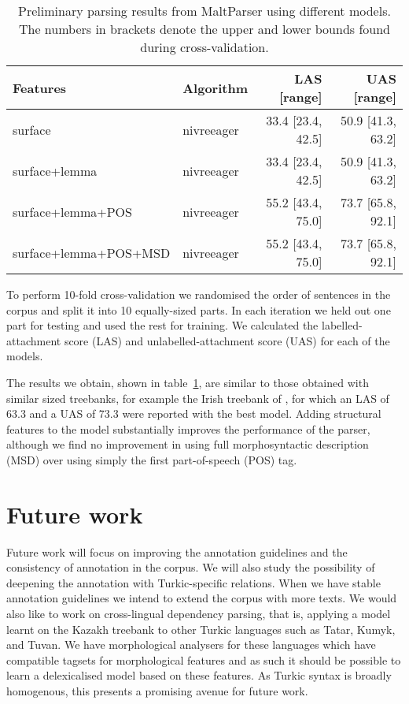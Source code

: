 \documentclass[a4paper,11pt, onecolumn,twoside]{article}
\begin{document}
\begin{table}[htbp]
	\caption{Preliminary parsing results from MaltParser using different models. The numbers in brackets denote the upper and lower bounds found during cross-validation.}
	\centering
	\begin{tabular}{llrr}
		\toprule
			\textbf{Features}       & \textbf{Algorithm} &\textbf{LAS} [range] & \textbf{UAS} [range] \\
		\midrule
			surface                & nivreeager  & 33.4 [23.4, 42.5] & 50.9 [41.3, 63.2] \\
			surface+lemma          & nivreeager  & 33.4 [23.4, 42.5] & 50.9 [41.3, 63.2] \\
			surface+lemma+POS      & nivreeager  & 55.2 [43.4, 75.0] & 73.7 [65.8, 92.1] \\
			surface+lemma+POS+MSD  & nivreeager  & 55.2 [43.4, 75.0] & 73.7 [65.8, 92.1] \\
		\bottomrule
	\end{tabular}
	\label{table:eval}
\end{table}

To perform 10-fold cross-validation we randomised the order of sentences in the corpus
and split it into 10 equally-sized parts. In each iteration we held out one part for testing and used
the rest for training. We calculated the labelled-attachment score (LAS) and 
unlabelled-attachment score (UAS) for each of the models.

The results we obtain, shown in table~\ref{table:eval}, are similar to those obtained with similar 
sized treebanks, for example the Irish treebank of \textcite{Lynn12}, for which an LAS of
63.3 and a UAS of 73.3 were reported with the best model.  Adding structural features to the model substantially improves the performance of the parser, although we find no improvement in using full morphosyntactic description (MSD) over using simply the first part-of-speech (POS) tag.


\section{Future work}\label{sec:future}




Future work will focus on improving the annotation guidelines and the consistency of
annotation in the corpus. We will also study the possibility of deepening the annotation
with Turkic-specific relations. When we have stable annotation guidelines we intend to 
extend the corpus with more texts.
We would also like to work on cross-lingual dependency parsing,
that is, applying a model learnt on the Kazakh treebank to other Turkic languages
such as Tatar, Kumyk, and Tuvan. We have morphological analysers for these languages which have
compatible tagsets for morphological features and as such it should be possible to learn a
delexicalised model based on these features. As Turkic syntax is broadly homogenous, this
presents a promising avenue for future work.
\end{document}

